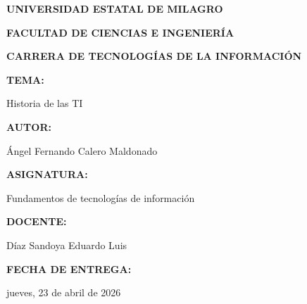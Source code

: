 \documentclass[12pt,a4paper]{article}
\begin{document}
	\begin{center}
		\singlespacing
		
		\vspace*{2cm}
		
		{\fontsize{14}{16}\selectfont\bfseries UNIVERSIDAD ESTATAL DE MILAGRO\par}
		\vspace{0.5cm}
		
		{\fontsize{13}{15}\selectfont\bfseries FACULTAD DE CIENCIAS E INGENIERÍA\par}
		\vspace{0.5cm}
		
		{\fontsize{13}{15}\selectfont\bfseries CARRERA DE TECNOLOGÍAS DE LA INFORMACIÓN\par}
		
		\vspace{1.5cm}
		
		{\fontsize{13}{15}\selectfont\bfseries TEMA:\par}
		\vspace{0.2cm}
		{\fontsize{13}{15}\selectfont Historia de las TI\par}
		
		\vspace{1cm}
		
		{\fontsize{13}{15}\selectfont\bfseries AUTOR:\par}
		\vspace{0.2cm}
		{\fontsize{13}{15}\selectfont Ángel Fernando Calero Maldonado\par}
		
		\vspace{1cm}
		
		{\fontsize{13}{15}\selectfont\bfseries ASIGNATURA:\par}
		\vspace{0.2cm}
		{\fontsize{13}{15}\selectfont Fundamentos de tecnologías de información\par}
		
		\vspace{1cm}
		
		{\fontsize{13}{15}\selectfont\bfseries DOCENTE:\par}
		\vspace{0.2cm}
		{\fontsize{13}{15}\selectfont Díaz Sandoya Eduardo Luis\par}
		
		\vspace{1cm}
		
		{\fontsize{13}{15}\selectfont\bfseries FECHA DE ENTREGA:\par}
		\vspace{0.2cm}
		{\fontsize{13}{15}\selectfont jueves, 23 de abril de 2026\par}
		

\end{center}
\end{document}
